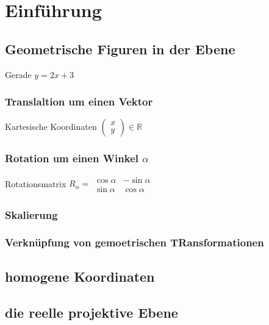 \section{Einführung}


\subsection{Geometrische Figuren in der Ebene}

Gerade \(y = 2x + 3\)

\subsubsection{Translaltion um einen Vektor}

Kartesische Koordinaten \(\begin{pmatrix} x \\ y\end{pmatrix} \in \mathbb{R}\)

\subsubsection{Rotation um einen Winkel $\alpha$}

Rotationsmatrix $R_\alpha = \begin{matrix}\cos \alpha & -\sin \alpha \\
\sin \alpha & \cos \alpha \end{matrix}$


\subsubsection{Skalierung}

\subsubsection{Verknüpfung von gemoetrischen TRansformationen}

\subsection{homogene Koordinaten}

\subsection{die reelle projektive Ebene}

